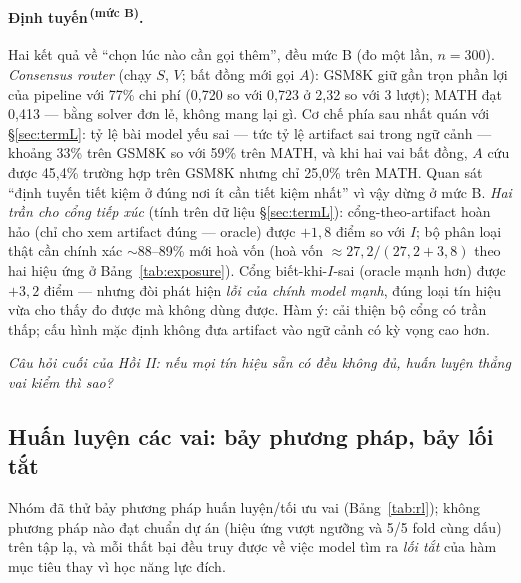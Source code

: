 \documentclass[11pt,a4paper]{article}
\newcommand{\mucB}{\textsuperscript{\,(mức B)}}
\begin{document}
\paragraph{Định tuyến\mucB.} Hai kết quả về ``chọn lúc nào cần gọi thêm'', đều mức B (đo một
lần, $n=300$). \emph{Consensus router} (chạy $S$, $V$; bất đồng mới gọi $A$): GSM8K giữ gần
trọn phần lợi của pipeline với 77\% chi phí (0,720 so với 0,723 ở 2,32 so với 3 lượt); MATH
đạt 0,413 --- bằng solver đơn lẻ, không mang lại gì. Cơ chế phía sau nhất quán với
\S\ref{sec:termL}: tỷ lệ bài model yếu sai --- tức tỷ lệ artifact sai trong ngữ cảnh --- khoảng
33\% trên GSM8K so với 59\% trên MATH, và khi hai vai bất đồng, $A$ cứu được 45,4\% trường hợp
trên GSM8K nhưng chỉ 25,0\% trên MATH. Quan sát ``định tuyến tiết kiệm ở đúng nơi ít cần tiết
kiệm nhất'' vì vậy dừng ở mức B. \emph{Hai trần cho cổng tiếp xúc} (tính trên dữ liệu
\S\ref{sec:termL}): cổng-theo-artifact hoàn hảo (chỉ cho xem artifact đúng --- oracle) được
$+1{,}8$ điểm so với $I$; bộ phân loại thật cần chính xác $\sim$88--89\% mới hoà vốn (hoà vốn
$\approx 27{,}2/(27{,}2+3{,}8)$ theo hai hiệu ứng ở Bảng~\ref{tab:exposure}). Cổng
biết-khi-$I$-sai (oracle mạnh hơn) được $+3{,}2$ điểm --- nhưng đòi phát hiện \emph{lỗi của
chính model mạnh}, đúng loại tín hiệu vừa cho thấy đo được mà không dùng được. Hàm ý: cải thiện
bộ cổng có trần thấp; cấu hình mặc định không đưa artifact vào ngữ cảnh có kỳ vọng cao hơn.

\emph{Câu hỏi cuối của Hồi II: nếu mọi tín hiệu sẵn có đều không đủ, huấn luyện thẳng vai
kiểm thì sao?}

\subsection{Huấn luyện các vai: bảy phương pháp, bảy lối tắt}\label{sec:rl}

Nhóm đã thử bảy phương pháp huấn luyện/tối ưu vai (Bảng~\ref{tab:rl}); không phương pháp nào
đạt chuẩn dự án (hiệu ứng vượt ngưỡng và 5/5 fold cùng dấu) trên tập lạ, và mỗi thất bại đều
truy được về việc model tìm ra \emph{lối tắt} của hàm mục tiêu thay vì học năng lực đích.
\end{document}
